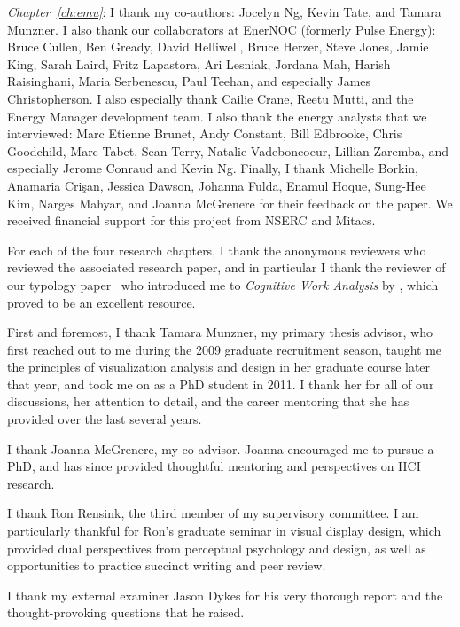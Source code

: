 {\it Chapter~\ref{ch:emu}}: I thank my co-authors: Jocelyn Ng, Kevin Tate, and Tamara Munzner. 
I also thank our collaborators at EnerNOC (formerly Pulse Energy): Bruce Cullen, Ben Gready, David Helliwell, Bruce Herzer, Steve Jones, Jamie King, Sarah Laird, Fritz Lapastora, Ari Lesniak, Jordana Mah, Harish Raisinghani, Maria Serbenescu, Paul Teehan, and especially James Christopherson.
I also especially thank Cailie Crane, Reetu Mutti, and the Energy Manager development team. 
I also thank the energy analysts that we interviewed: Marc Etienne Brunet, Andy Constant, Bill Edbrooke, Chris Goodchild, Marc Tabet, Sean Terry, Natalie Vadeboncoeur, Lillian Zaremba, and especially Jerome Conraud and Kevin Ng. 
Finally, I thank Michelle Borkin, Anamaria Cri\c{s}an, Jessica Dawson, Johanna Fulda, Enamul Hoque, Sung-Hee Kim, Narges Mahyar, and Joanna McGrenere for their feedback on the paper.
We received financial support for this project from NSERC and Mitacs. 

For each of the four research chapters, I thank the anonymous reviewers who reviewed the associated research paper, and in particular I thank the reviewer of our typology paper~\cite{Brehmer2013} who introduced me to {\it Cognitive Work Analysis} by \citet{Vicente1999}, which proved to be an excellent resource.


First and foremost, I thank Tamara Munzner, my primary thesis advisor, who first reached out to me during the 2009 graduate recruitment season, taught me the principles of visualization analysis and design in her graduate course later that year, and took me on as a PhD student in 2011. 
I thank her for all of our discussions, her attention to detail, and the career mentoring that she has provided over the last several years.

I thank Joanna McGrenere, my co-advisor. 
Joanna encouraged me to pursue a PhD, and has since provided thoughtful mentoring and perspectives on HCI research.

I thank Ron Rensink, the third member of my supervisory committee. I am particularly thankful for Ron's graduate seminar in visual display design, which provided dual perspectives from perceptual psychology and design, as well as opportunities to practice succinct writing and peer review.

I thank my external examiner Jason Dykes for his very thorough report and the thought-provoking questions that he raised.

